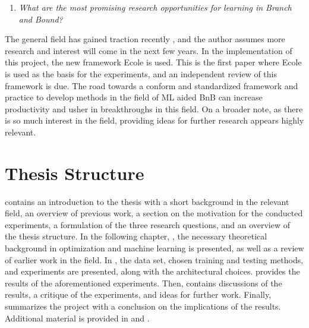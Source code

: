 %
\begin{enumerate}[resume*]
    \item \textit{What are the most promising research opportunities for learning in Branch and Bound?}
\end{enumerate}
%
The general field has gained traction recently \cite{bengio2020machine}, and the author assumes more research and interest will come in the next few years. In the implementation of this project, the new framework \gls{Ecole} is used. This is the first paper where \gls{Ecole} is used as the basis for the experiments, and an independent review of this framework is due. The road towards a conform and standardized framework and practice to develop methods in the field of \gls{ML} aided \Gls{BnB} can increase productivity and usher in breakthroughs in this field. On a broader note, as there is so much interest in the field, providing ideas for further research appears highly relevant. 



\section{Thesis Structure}\label{sec:int_structure}


 contains an introduction to the thesis with a short background in the relevant field, an overview of previous work, a section on the motivation for the conducted experiments, a formulation of the three research questions, and an overview of the thesis structure. 
In the following chapter, , the necessary theoretical background in optimization and machine learning is presented, as well as a review of earlier work in the field. In , the data set, chosen training and testing methods, and experiments are presented, along with the architectural choices.  provides the results of the aforementioned experiments. Then,  contains discussions of the results, a critique of the experiments, and ideas for further work. Finally,  summarizes the project with a conclusion on the implications of the results. Additional material is provided in  and .
